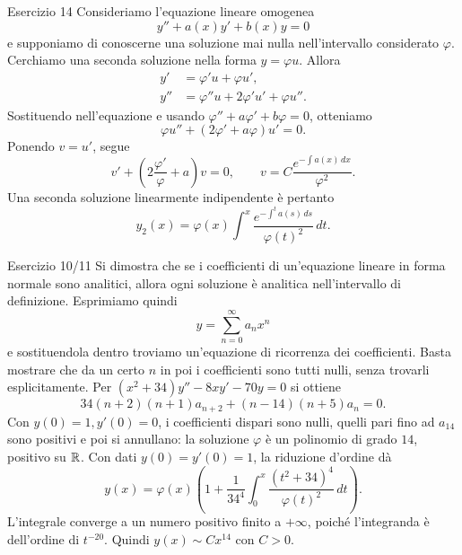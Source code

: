 \documentclass[a4paper]{article}
\begin{document}
\begin{radioactive}
\begin{snippetexercise}{Esercizio 14}
    Consideriamo l'equazione lineare omogenea
    \[
        y''+a(x)y'+b(x)y=0
    \]
    e supponiamo di conoscerne una soluzione mai nulla nell'intervallo considerato \(\varphi\). Cerchiamo una
    seconda soluzione nella forma \(y=\varphi u\). Allora
    \begin{align*}
        y' &= \varphi' u + \varphi u', \\
        y'' &= \varphi'' u + 2\varphi' u' + \varphi u''.
    \end{align*}
    Sostituendo nell'equazione e usando
    \(\varphi''+a\varphi'+b\varphi=0\), otteniamo
    \[
        \varphi u''+(2\varphi'+a\varphi)u'=0.
    \]
    Ponendo \(v=u'\), segue
    \[
        v'+\left(2\frac{\varphi'}{\varphi}+a\right)v=0,
        \qquad
        v=C\frac{e^{-\int a(x)\,dx}}{\varphi^2}.
    \]
    Una seconda soluzione linearmente indipendente è pertanto
    \[
        y_2(x)=\varphi(x)\int^x
        \frac{e^{-\int^t a(s)\,ds}}{\varphi(t)^2}\,dt.
    \]
\end{snippetexercise}
\end{radioactive}

\begin{radioactive}
\begin{snippetexercise}{Esercizio 10/11}
    Si dimostra che se i coefficienti di un'equazione lineare in forma normale
    sono analitici, allora ogni soluzione è analitica nell’intervallo di definizione.
    Esprimiamo quindi
    \[
        y = \sum_{n=0}^\infty a_n x^n
    \]
    e sostituendola dentro troviamo un'equazione di ricorrenza dei coefficienti.
    Basta mostrare che da un certo \(n\) in poi i coefficienti sono tutti nulli,
    senza trovarli esplicitamente. Per \((x^2+34)y''-8xy'-70y=0\) si ottiene
    \[
        34(n+2)(n+1)a_{n+2}+(n-14)(n+5)a_n=0.
    \]
    Con \(y(0)=1,y'(0)=0\), i coefficienti dispari sono nulli,
    quelli pari fino ad \(a_{14}\) sono positivi e poi si annullano:
    la soluzione \(\varphi\) è un polinomio di grado \(14\), positivo su
    \(\mathbb{R}\). Con dati \(y(0)=y'(0)=1\), la riduzione d'ordine dà
    \[
        y(x)=\varphi(x)\left(1+\frac1{34^4}
        \int_0^x\frac{(t^2+34)^4}{\varphi(t)^2}\,dt\right).
    \]
    L'integrale converge a un numero positivo finito a \(+\infty\),
    poiché l'integranda è dell'ordine di \(t^{-20}\).
    Quindi \(y(x)\sim Cx^{14}\) con \(C>0\).
\end{snippetexercise}
\end{radioactive}
\end{document}
